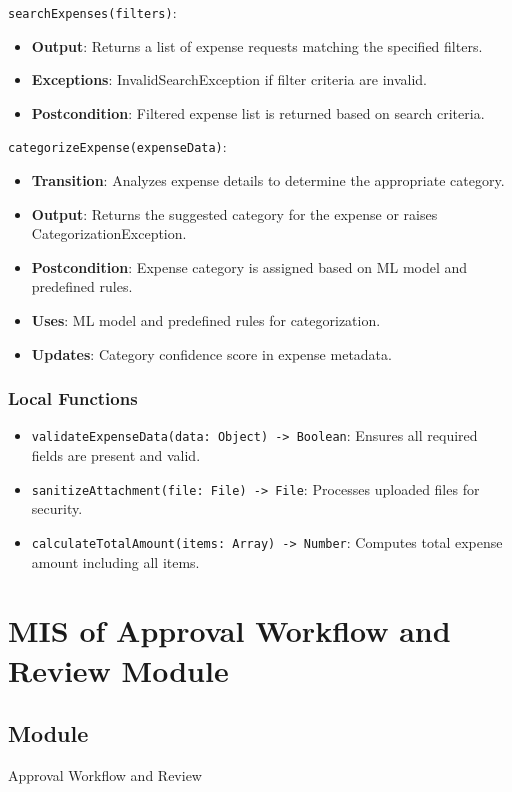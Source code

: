 \documentclass[12pt, titlepage]{article}
\begin{document}
\noindent \texttt{searchExpenses(filters)}:
\begin{itemize}
    \item \textbf{Output}: Returns a list of expense requests matching the specified filters.
    \item \textbf{Exceptions}: InvalidSearchException if filter criteria are invalid.
    \item \textbf{Postcondition}: Filtered expense list is returned based on search criteria.
\end{itemize}

\noindent \texttt{categorizeExpense(expenseData)}:
\begin{itemize}
    \item \textbf{Transition}: Analyzes expense details to determine the appropriate category.
    \item \textbf{Output}: Returns the suggested category for the expense or raises CategorizationException.
    \item \textbf{Postcondition}: Expense category is assigned based on ML model and predefined rules.
    \item \textbf{Uses}: ML model and predefined rules for categorization.
    \item \textbf{Updates}: Category confidence score in expense metadata.
\end{itemize}

\subsubsection{Local Functions}
\begin{itemize}
    \item \texttt{validateExpenseData(data: Object) -> Boolean}: Ensures all required fields are present and valid.
    \item \texttt{sanitizeAttachment(file: File) -> File}: Processes uploaded files for security.
    \item \texttt{calculateTotalAmount(items: Array) -> Number}: Computes total expense amount including all items.
\end{itemize}

\section{MIS of Approval Workflow and Review Module}

\subsection{Module}
Approval Workflow and Review
\end{document}
